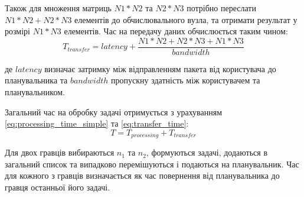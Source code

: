 Також для множення матриць $N1*N2$ та $N2*N3$ потрібно переслати $N1*N2 + N2*N3$ елементів до обчислювального вузла, та отримати результат у розмірі $N1*N3$ елементів. Час на передачу даних обчислюється таким чином:
\begin{equation}
\label{eq:transfer_time}
T_{transfer} = latency + \frac{N1*N2+N2*N3+N1*N3}{bandwidth}
\end{equation}
\par де $latency$ визначає затримку між відправленням пакета від користувача до планувальника та $bandwidth$ пропускну здатність між користувачем та планувальником.

Загальний час на обробку задачі отримується з урахуванням \ref{eq:processing_time_simple} та \ref{eq:transfer_time}:
\begin{equation}
\label{eq:total_task_processing_time}
T = T_{processing} + T_{transfer}
\end{equation}

Для двох гравців вибираються $n_1$ та $n_2$, формуються задачі, додаються в загальний список та випадково перемішуються і подаються на планувальник. Час для кожного з гравців визначається як час повернення від планувальника до гравця останньої його задачі.